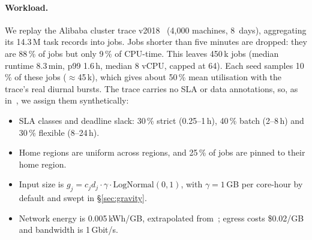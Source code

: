\paragraph{Workload.}
We replay the Alibaba cluster trace v2018~\cite{guo2019alibaba}
(4{,}000 machines, 8~days), aggregating its 14.3\,M task records into jobs.
Jobs shorter than five minutes are dropped: they are 88\,\% of jobs but
only 9\,\% of CPU-time. This leaves 450\,k jobs (median runtime 8.3\,min,
p99 1.6\,h, median 8 vCPU, capped at 64). Each seed samples 10\,\% of
these jobs ($\approx$45\,k), which gives about 50\,\% mean utilisation with
the trace's real diurnal bursts. The trace carries no SLA or data
annotations, so, as in~\cite{wiesner2021wait}, we assign them
synthetically:
\begin{itemize}
\item SLA classes and deadline slack: 30\,\% strict (0.25--1\,h),
  40\,\% batch (2--8\,h) and 30\,\% flexible (8--24\,h).
\item Home regions are uniform across regions, and 25\,\% of jobs are
  pinned to their home region.
\item Input size is $g_j = c_j d_j \cdot \gamma \cdot \text{LogNormal}(0,1)$,
  with $\gamma=1$\,GB per core-hour by default and swept in \S\ref{sec:gravity}.
\item Network energy is 0.005\,kWh/GB, extrapolated from~\cite{aslan2018network};
  egress costs \$0.02/GB and bandwidth is 1\,Gbit/s.
\end{itemize}

